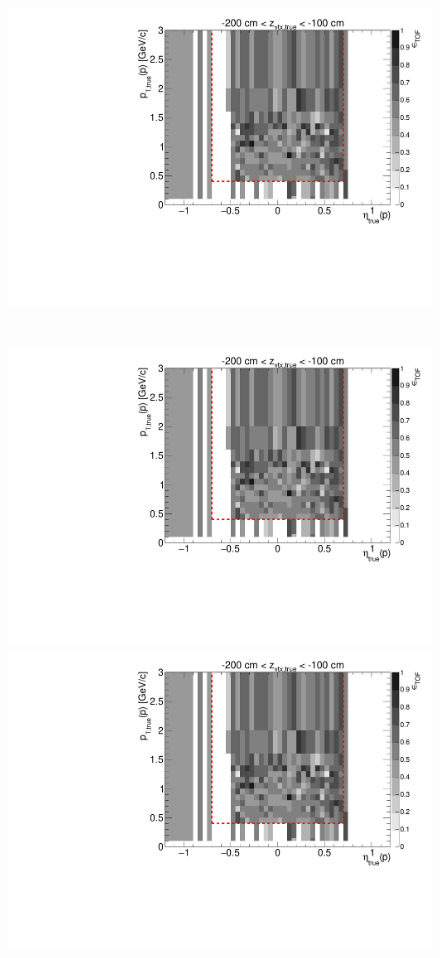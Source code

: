 \begin{figure}[hb]
{  \includegraphics[width=\linewidth,page=17]{graphics/eff/Eff2D_TOF_proton_Minus.pdf}
}~
\parbox{0.495\textwidth}{
  \centering
  \includegraphics[width=\linewidth,page=12]{graphics/eff/Eff2D_TOF_proton_Minus.pdf}\\
  \includegraphics[width=\linewidth,page=14]{graphics/eff/Eff2D_TOF_proton_Minus.pdf}\\
}
\end{figure}
